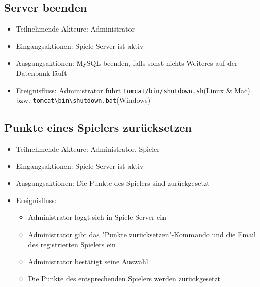 \documentclass[a4paper]{scrreprt}
\begin{document}
    \subsection{Server beenden}
    \begin{itemize}
        \item Teilnehmende Akteure: \Gls{Administrator}
        \item Eingangsaktionen: Spiele-Server ist aktiv
        \item Ausgangsaktionen: MySQL beenden, falls sonst nichts Weiteres auf der Datenbank läuft
        \item Ereignisfluss: Administrator führt \texttt{tomcat/bin/shutdown.sh}(Linux \& Mac) bzw. \texttt{tomcat\textbackslash bin\textbackslash shutdown.bat}(Windows)
    \end{itemize}

    \subsection{Punkte eines Spielers zurücksetzen}
    \begin{itemize}
        \item Teilnehmende Akteure: \Gls{Administrator}, \Gls{Spieler}
        \item Eingangsaktionen: Spiele-Server ist aktiv
        \item Ausgangsaktionen: Die Punkte des Spielers sind zurückgesetzt
        \item Ereignisfluss:
        \begin{itemize}
            \item Administrator loggt sich in Spiele-Server ein
            \item Administrator gibt das "Punkte zurücksetzen"-Kommando und die Email des registrierten Spielers ein
            \item Administrator bestätigt seine Auswahl
            \item Die Punkte des entsprechenden Spielers werden zurückgesetzt
        \end{itemize}
    \end{itemize}
\end{document}
